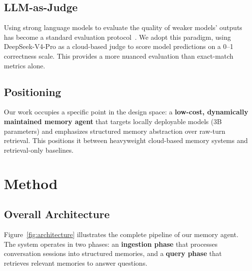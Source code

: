 \documentclass[11pt]{article}
\begin{document}
\subsection{LLM-as-Judge}

Using strong language models to evaluate the quality of weaker models' outputs has become a standard evaluation protocol~\cite{zheng2023judge}. We adopt this paradigm, using DeepSeek-V4-Pro as a cloud-based judge to score model predictions on a 0--1 correctness scale. This provides a more nuanced evaluation than exact-match metrics alone.

\subsection{Positioning}

Our work occupies a specific point in the design space: a \textbf{low-cost, dynamically maintained memory agent} that targets locally deployable models (3B parameters) and emphasizes structured memory abstraction over raw-turn retrieval. This positions it between heavyweight cloud-based memory systems and retrieval-only baselines.

\section{Method}

\subsection{Overall Architecture}

Figure~\ref{fig:architecture} illustrates the complete pipeline of our memory agent. The system operates in two phases: an \textbf{ingestion phase} that processes conversation sessions into structured memories, and a \textbf{query phase} that retrieves relevant memories to answer questions.
\end{document}
